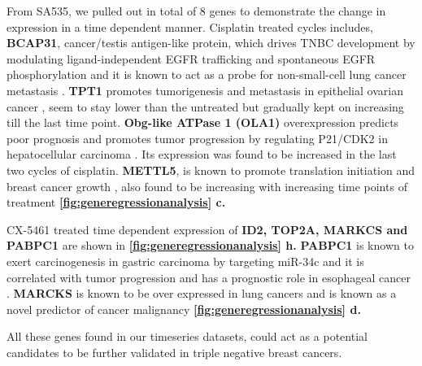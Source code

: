 From SA535, we pulled out in total of 8 genes to demonstrate the change in expression in a time dependent manner. Cisplatin treated cycles includes, \textbf{BCAP31}, cancer/testis antigen-like protein, which drives TNBC development by modulating ligand-independent EGFR trafficking and spontaneous EGFR phosphorylation and it is known to act as a probe for non-small-cell lung cancer metastasis
\cite{fu2019bcap31, wang2020bcap31}. \textbf{TPT1} promotes tumorigenesis and metastasis in epithelial ovarian cancer \cite{wu2019lncrna}, seem to stay lower than the untreated but gradually kept on increasing till the last time point. \textbf{Obg-like ATPase 1 (OLA1)} overexpression predicts poor prognosis and promotes tumor progression by regulating P21/CDK2 in hepatocellular carcinoma \cite{huang2020obg}. Its expression was found to be increased in the last two cycles of cisplatin. \textbf{METTL5}, is known to promote translation initiation and breast cancer growth \cite{zeng2020roles}, also found to be increasing with increasing time points of treatment \textbf{\autoref{fig:generegressionanalysis} c.}

CX-5461 treated time dependent expression of \textbf{ID2, TOP2A, MARKCS and PABPC1} are shown in \textbf{\autoref{fig:generegressionanalysis} h.}
\textbf{PABPC1} is known to exert carcinogenesis in gastric carcinoma by targeting miR-34c and it is correlated with tumor progression and has a prognostic role in esophageal cancer \cite{zhu2015pabpc1,takashima2006expression}. \textbf{MARCKS} is known to be over expressed in lung cancers and is known as a novel predictor of cancer malignancy  \cite{reddy2014marcks, chen2014novel} \textbf{\autoref{fig:generegressionanalysis} d.}

All these genes found in our timeseries datasets, could act as a potential candidates to be further validated in triple negative breast cancers.


